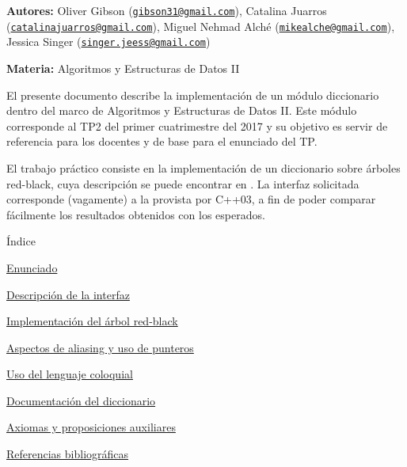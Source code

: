 
\begin{DoxyItemize}
\item {\bfseries Autores\+:} Oliver Gibson (\href{mailto:gibson31@gmail.com}{\tt gibson31@gmail.\+com}), Catalina Juarros (\href{mailto:catalinajuarros@gmail.com}{\tt catalinajuarros@gmail.\+com}), Miguel Nehmad Alché (\href{mailto:mikealche@gmail.com}{\tt mikealche@gmail.\+com}), Jessica Singer (\href{mailto:singer.jeess@gmail.com}{\tt singer.\+jeess@gmail.\+com})
\item {\bfseries Materia\+:} Algoritmos y Estructuras de Datos II
\end{DoxyItemize}

El presente documento describe la implementación de un módulo diccionario dentro del marco de Algoritmos y Estructuras de Datos II. Este módulo corresponde al T\+P2 del primer cuatrimestre del 2017 y su objetivo es servir de referencia para los docentes y de base para el enunciado del TP.

El trabajo práctico consiste en la implementación de un diccionario sobre árboles red-\/black, cuya descripción se puede encontrar en \cite{CormenLeisersonRivestStein2009}. La interfaz solicitada corresponde (vagamente) a la provista por C++03, a fin de poder comparar fácilmente los resultados obtenidos con los esperados.

\begin{DoxyParagraph}{Índice}

\end{DoxyParagraph}

\begin{DoxyItemize}
\item \hyperlink{Enunciado}{Enunciado}
\item \hyperlink{Interfaz}{Descripción de la interfaz}
\item \hyperlink{Implementacion}{Implementación del árbol red-\/black}
\item \hyperlink{Aliasing}{Aspectos de aliasing y uso de punteros}
\item \hyperlink{Castellano}{Uso del lenguaje coloquial}
\item \hyperlink{classaed2_1_1map}{Documentación del diccionario }
\item \hyperlink{axiomas}{Axiomas y proposiciones auxiliares}
\item \hyperlink{citelist}{Referencias bibliográficas} 
\end{DoxyItemize}